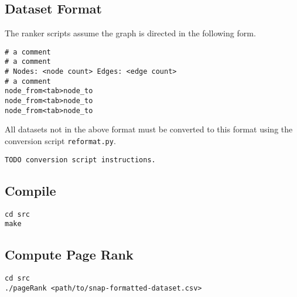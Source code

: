 \documentclass{report}
\begin{document}
\subsection{Dataset Format}
The ranker scripts assume the graph is directed in the following form.

\begin{lstlisting}
# a comment
# a comment
# Nodes: <node count> Edges: <edge count>
# a comment
node_from<tab>node_to
node_from<tab>node_to
node_from<tab>node_to
\end{lstlisting}

All datasets not in the above format must be converted to this format using the conversion script \texttt{reformat.py}.

\begin{lstlisting}
TODO conversion script instructions.
\end{lstlisting}

\subsection{Compile}
\begin{lstlisting}
cd src
make
\end{lstlisting}

\subsection{Compute Page Rank}
\begin{lstlisting}
cd src
./pageRank <path/to/snap-formatted-dataset.csv>
\end{lstlisting}
\end{document}

